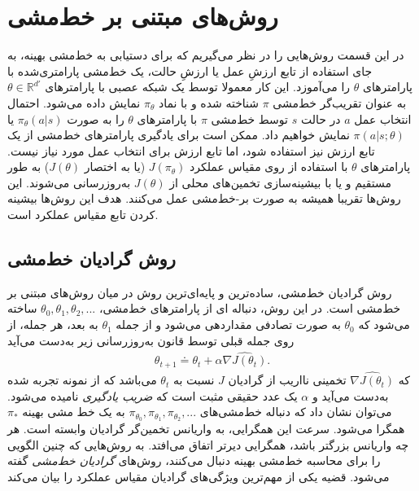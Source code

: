 \section{روش‌های مبتنی بر خط‌مشی}
در این قسمت روش‌هایی را در نظر می‌گیریم که برای دستیابی به خط‌مشی بهینه، به جای استفاده از تابع ارزشِ عمل یا ارزشِ حالت، یک خط‌مشی پارامتری‌شده 
با پارامترهای $\theta$ را می‌آموزد.  این کار  معمولا توسط یک شبکه عصبی با پارامترهای 
$\theta \in \mathbb{R}^{d'}$
 به عنوان تقریب‌گر خط‌مشی 
$\pi$
شناخته شده و با نماد $\pi_\theta$ نمایش داده می‌شود. احتمال انتخاب عمل $a$ در حالت $s$ توسط خط‌مشی $\pi$ با پارامترهای $\theta$ را به صورت
$\pi_\theta(a|s)$
یا
$\pi(a|s;\theta)$
نمایش خواهیم داد.
ممکن است برای یادگیری پارامترهای خط‌مشی از یک تابع ارزش نیز استفاده شود، اما تابع ارزش برای انتخاب عمل مورد نیاز نیست. 
پارامترهای $\theta$ با استفاده از 
روی مقیاس عملکرد 
$J(\pi_\theta)$
(یا به اختصار $J(\theta)$)
به طور مستقیم و یا با بیشینه‌سازی تخمین‌های محلی از  $J(\theta)$ به‌روزرسانی می‌شوند.
این روش‌ها تقریبا همیشه به صورت بر-خط‌مشی  عمل می‌کنند. 
 هدف این روش‌ها بیشینه کردن تابع مقیاس عملکرد است. 
 
 
 \subsection{روش گرادیان خط‌مشی}
روش گرادیان خط‌مشی، ساده‌ترین و پایه‌ای‌ترین روش در میان روش‌های مبتنی بر خط‌مشی است. در این روش، دنباله‌
ای از پارامترهای خط‌مشی، 
$\theta_0, \theta_1, \theta_2, ...$
ساخته می‌شود که $\theta_0$ به صورت تصادفی مقداردهی می‌شود و از جمله 
$\theta_1$
به بعد، هر جمله، از روی جمله قبلی توسط قانون به‌روزرسانی زیر به‌دست می‌آید
\begin{align}
\theta_{t+1} \doteq \theta_t + \alpha \widehat{\nabla J(\theta_t)}.
\label{eq:updatepg}
\end{align}
که 
$\widehat{\nabla J(\theta_t)}$
تخمینی نااریب از گرادیان  $J$ نسبت به 
$\theta_t$
 می‌باشد که از نمونه تجربه شده به‌دست می‌آید و $\alpha$ یک عدد حقیقی مثبت است که 
 \textit{ضریب یادگیری}
 نامیده می‌شود. می‌توان نشان داد که دنباله خط‌مشی‌های
 $\pi_{\theta_0}, \pi_{\theta_1}, \pi_{\theta_2}, ...$
 به یک خط مشی بهینه $\pi_*$ همگرا می‌شود. سرعت این همگرایی، به واریانس تخمین‌گر گرادیان وابسته است. هر چه واریانس بزرگتر باشد، همگرایی دیرتر اتفاق می‌افتد. به روش‌هایی که چنین الگویی را برای محاسبه خط‌مشی بهینه دنبال می‌کنند، روش‌های 
\textit{گرادیان خط‌مشی}
 گفته می‌شود. قضیه
 	یکی از مهم‌ترین ویژگی‌های گرادیان مقیاس عملکرد را بیان می‌کند

